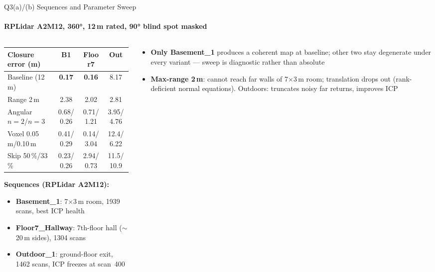 \documentclass[aspectratio=169,10pt]{beamer}
\begin{document}
\begin{frame}[shrink=5]{Q3(a)/(b) Sequences and Parameter Sweep}
  \framesubtitle{RPLidar A2M12, 360°, 12\,m rated, 90° blind spot masked}
  \begin{columns}[T]
    \begin{column}{0.50\textwidth}
      {\footnotesize
      \begin{tabular}{@{}p{2.2cm}ccc@{}}
        \toprule
        \textbf{Closure error (m)} & \textbf{B1} & \textbf{Floor7} & \textbf{Out}\\
        \midrule
        Baseline (12\,m)         & \textbf{0.17} & \textbf{0.16} & 8.17\\
        Range 2\,m               & 2.38 & 2.02 & 2.81\\
        Angular $n{=}2$/$n{=}3$  & 0.68/0.26 & 0.71/1.21 & 3.95/4.76\\
        Voxel 0.05\,m/0.10\,m   & 0.41/0.29 & 0.14/3.04 & 12.4/6.22\\
        Skip 50\,\%/33\,\%       & 0.23/0.26 & 2.94/0.73 & 11.5/10.9\\
        \bottomrule
      \end{tabular}}
      \vspace{0.3em}
      {\footnotesize\textbf{Sequences (RPLidar A2M12):}}
      \begin{itemize}\footnotesize
        \item \textbf{Basement\_1}: 7$\times$3\,m room, 1939 scans, best ICP health
        \item \textbf{Floor7\_Hallway}: 7th-floor hall ($\sim$20\,m sides), 1304 scans
        \item \textbf{Outdoor\_1}: ground-floor exit, 1462 scans, ICP freezes at scan~400
      \end{itemize}
    \end{column}
    \begin{column}{0.47\textwidth}
      \begin{itemize}\small
        \item \textbf{Only Basement\_1} produces a coherent map at baseline; other two stay degenerate under every variant --- sweep is diagnostic rather than absolute
        \item \textbf{Max-range 2\,m}: cannot reach far walls of 7$\times$3\,m room; translation drops out (rank-deficient normal equations). Outdoors: truncates noisy far returns, improves ICP

\end{itemize}
\end{column}
\end{columns}
\end{frame}
\end{document}
